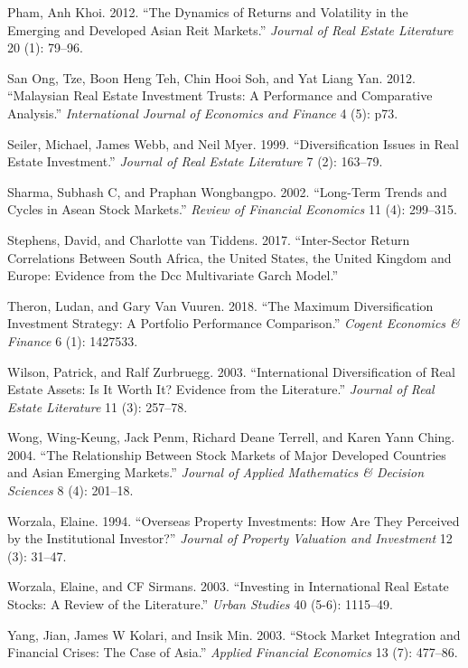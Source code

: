 \documentclass[11pt,preprint, authoryear]{elsarticle}
\numberwithin{equation}{section}
\numberwithin{figure}{section}
\numberwithin{table}{section}
\begin{document}
\leavevmode\hypertarget{ref-pham2012dynamics}{}%
Pham, Anh Khoi. 2012. ``The Dynamics of Returns and Volatility in the
Emerging and Developed Asian Reit Markets.'' \emph{Journal of Real
Estate Literature} 20 (1): 79--96.

\leavevmode\hypertarget{ref-san2012malaysian}{}%
San Ong, Tze, Boon Heng Teh, Chin Hooi Soh, and Yat Liang Yan. 2012.
``Malaysian Real Estate Investment Trusts: A Performance and Comparative
Analysis.'' \emph{International Journal of Economics and Finance} 4 (5):
p73.

\leavevmode\hypertarget{ref-seiler1999diversification}{}%
Seiler, Michael, James Webb, and Neil Myer. 1999. ``Diversification
Issues in Real Estate Investment.'' \emph{Journal of Real Estate
Literature} 7 (2): 163--79.

\leavevmode\hypertarget{ref-sharma2002long}{}%
Sharma, Subhash C, and Praphan Wongbangpo. 2002. ``Long-Term Trends and
Cycles in Asean Stock Markets.'' \emph{Review of Financial Economics} 11
(4): 299--315.

\leavevmode\hypertarget{ref-stephensinter2017}{}%
Stephens, David, and Charlotte van Tiddens. 2017. ``Inter-Sector Return
Correlations Between South Africa, the United States, the United Kingdom
and Europe: Evidence from the Dcc Multivariate Garch Model.''

\leavevmode\hypertarget{ref-theron2018maximum}{}%
Theron, Ludan, and Gary Van Vuuren. 2018. ``The Maximum Diversification
Investment Strategy: A Portfolio Performance Comparison.'' \emph{Cogent
Economics \& Finance} 6 (1): 1427533.

\leavevmode\hypertarget{ref-wilson2003international}{}%
Wilson, Patrick, and Ralf Zurbruegg. 2003. ``International
Diversification of Real Estate Assets: Is It Worth It? Evidence from the
Literature.'' \emph{Journal of Real Estate Literature} 11 (3): 257--78.

\leavevmode\hypertarget{ref-wong2004relationship}{}%
Wong, Wing-Keung, Jack Penm, Richard Deane Terrell, and Karen Yann
Ching. 2004. ``The Relationship Between Stock Markets of Major Developed
Countries and Asian Emerging Markets.'' \emph{Journal of Applied
Mathematics \& Decision Sciences} 8 (4): 201--18.

\leavevmode\hypertarget{ref-worzala1994overseas}{}%
Worzala, Elaine. 1994. ``Overseas Property Investments: How Are They
Perceived by the Institutional Investor?'' \emph{Journal of Property
Valuation and Investment} 12 (3): 31--47.

\leavevmode\hypertarget{ref-worzala2003investing}{}%
Worzala, Elaine, and CF Sirmans. 2003. ``Investing in International Real
Estate Stocks: A Review of the Literature.'' \emph{Urban Studies} 40
(5-6): 1115--49.

\leavevmode\hypertarget{ref-yang2003stock}{}%
Yang, Jian, James W Kolari, and Insik Min. 2003. ``Stock Market
Integration and Financial Crises: The Case of Asia.'' \emph{Applied
Financial Economics} 13 (7): 477--86.




\end{document}
